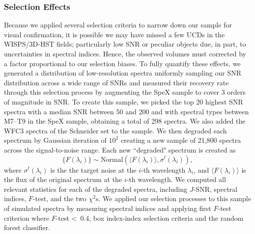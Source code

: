 \documentclass[manuscript]{aastex63}
\begin{document}
\subsubsection{Selection Effects}
Because we applied several selection criteria to narrow down our sample for visual confirmation, it is possible we may have missed a few UCDs in the WISPS/3D-HST fields; particularly low SNR or peculiar objects due, in part, to uncertainties in spectral indices. Hence, the observed volumes must corrected by a factor proportional to our selection biases. To fully quantify these effects, we generated a distribution of low-resolution spectra uniformly sampling our SNR distribution across a wide range of SNRs and measured their recovery rate through this selection process by augmenting the SpeX sample to cover 3 orders of magnitude in SNR. To create this sample, we picked the top 20 highest SNR spectra with a median SNR between 50 and 200 and with spectral types between M7--T9 in the SpeX sample, obtaining a total of 298 spectra. We also added the WFC3 spectra of the Schneider set to the sample. We then degraded each spectrum by Gaussian iteration of $10^2$ creating a new sample of 21,800 spectra across the signal-to-noise range. Each new ``degraded" spectrum is created as 
\begin{equation} 
\{F(\lambda _i)\} \sim \text{Normal} (\langle F(\lambda_i)\rangle, \sigma^t(\lambda_i )), 
\end{equation} 
where $\sigma^t(\lambda_i )$ is the the target noise at the $i$-th wavelength $\lambda_i$, and $\langle F(\lambda_i )\rangle$ is the flux of the original spectrum at the $i$-th wavelength. We computed all relevant statistics for each of the degraded spectra, including $J$-SNR, spectral indices, $F$-test, and the two $\chi^2$s. We applied our selection processes to this sample of simulated spectra by measuring spectral indices and applying first $F$-test criterion where $F$-test \textless\ 0.4, box index-index selection criteria and the random forest classifier. 
\end{document}

